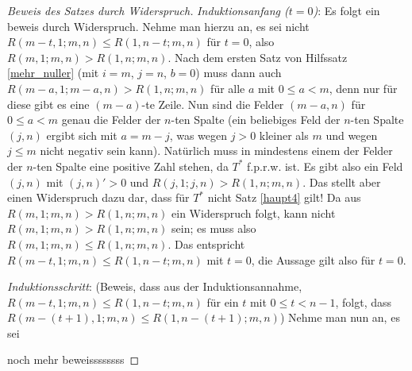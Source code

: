 \begin{proof}[Beweis des Satzes durch Widerspruch]
    \textit{Induktionsanfang ($t=0$)}: Es folgt ein beweis durch Widerspruch. Nehme man hierzu an, es sei nicht 
    $R(m-t, 1; m, n)\leq R(1, n-t; m, n)$ für $t=0$, also $R(m, 1; m, n)>R(1, n; m, n)$. Nach dem ersten Satz von 
    Hilfssatz \ref{mehr_nuller} (mit $i=m$, $j=n$, $b=0$) muss dann auch $R(m-a, 1; m-a, n) > R(1, n; m, n)$ für alle 
    $a$ mit $0\leq a<m$, denn nur für diese gibt es eine $(m-a)$-te Zeile. Nun sind die Felder $(m-a, n)$ für $0\leq 
    a<m$ genau die Felder der $n$-ten Spalte (ein beliebiges Feld der $n$-ten Spalte $(j, n)$ ergibt sich mit $a=m-j$, 
    was wegen $j>0$ kleiner als $m$ und wegen $j\leq m$ nicht negativ sein kann). Natürlich muss in mindestens einem 
    der Felder der $n$-ten Spalte eine positive Zahl stehen, da $T^*$ f.p.r.w. ist. Es gibt also ein Feld $(j, n)$ 
    mit $(j, n)'>0$ und $R(j, 1; j, n)>R(1, n; m, n)$. Das stellt aber einen Widerspruch dazu dar, dass für $T^*$ nicht 
    Satz \ref{haupt4} gilt! Da aus $R(m, 1; m, n)>R(1, n; m, n)$ ein Widerspruch folgt, kann nicht $R(m, 1; m, n)>
    R(1, n; m, n)$ sein; es muss also $R(m, 1; m, n)\leq R(1, n; m, n)$. Das entspricht $R(m-t, 1; m, n)\leq 
    R(1, n-t; m, n)$ mit $t=0$, die Aussage gilt also für $t=0$.


    \textit{Induktionsschritt}: (Beweis, dass aus der Induktionsannahme, $R(m-t, 1; m, n)\leq R(1, n-t; m, n)$ für 
    ein $t$ mit $0\leq t<n-1$, folgt, dass $R(m-(t+1), 1; m, n)\leq R(1, n-(t+1); m, n)$) Nehme man nun an, es sei 






    noch mehr beweissssssss
    \renewcommand{\qedsymbol}{$\blacksquare$}
\end{proof}